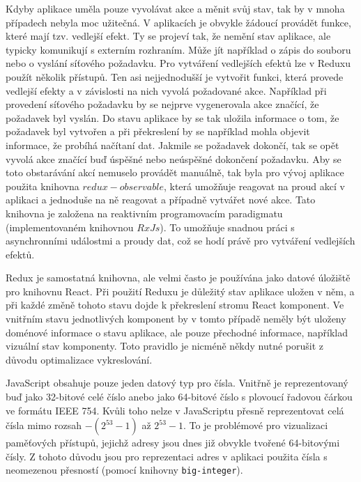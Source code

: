 Kdyby aplikace uměla pouze vyvolávat akce a měnit svůj stav, tak by v mnoha případech nebyla moc užitečná. V aplikacích je obvykle žádoucí provádět funkce, které mají tzv. vedlejší efekt. Ty se projeví tak, že nemění stav aplikace, ale typicky komunikují s externím rozhraním. Může jít například o zápis do souboru nebo o vyslání síťového požadavku. Pro vytváření vedlejších efektů lze v Reduxu použít několik přístupů. Ten asi nejjednodušší je vytvořit funkci, která provede vedlejší efekty a v závislosti na nich vyvolá požadované akce. Například při provedení síťového požadavku by se nejprve vygenerovala akce značící, že požadavek byl vyslán. Do stavu aplikace by se tak uložila informace o tom, že požadavek byl vytvořen a při překreslení by se například mohla objevit informace, že probíhá načítaní dat. Jakmile se požadavek dokončí, tak se opět vyvolá akce značící buď úspěšné nebo neúspěšné dokončení požadavku. Aby se toto obstarávání akcí nemuselo provádět manuálně, tak byla pro vývoj aplikace použita knihovna $redux-observable$, která umožňuje reagovat na proud akcí v aplikaci a jednoduše na ně reagovat a případně vytvářet nové akce. Tato knihovna je založena na reaktivním programovacím paradigmatu (implementovaném knihovnou $RxJs$). To umožňuje snadnou práci s asynchronními událostmi a proudy dat, což se hodí právě pro vytváření vedlejších efektů.

Redux je samostatná knihovna, ale velmi často je používána jako datové úložiště pro knihovnu React. Při použití Reduxu je důležitý stav aplikace uložen v něm, a při každé změně tohoto stavu dojde k překreslení stromu React komponent. Ve vnitřním stavu jednotlivých komponent by v tomto případě neměly být uloženy doménové informace o stavu aplikace, ale pouze přechodné informace, například vizuální stav komponenty. Toto pravidlo je nicméně někdy nutné porušit z důvodu optimalizace vykreslování.

JavaScript obsahuje pouze jeden datový typ pro čísla. Vnitřně je reprezentovaný buď jako 32-bitové celé číslo anebo jako 64-bitové číslo s plovoucí řadovou čárkou ve formátu IEEE 754. Kvůli toho nelze v JavaScriptu přesně reprezentovat celá čísla mimo rozsah $-(2^{53} - 1)$ až $2^{53} - 1$. To je problémové pro vizualizaci paměťových přístupů, jejichž adresy jsou dnes již obvykle tvořené 64-bitovými čísly. Z tohoto důvodu jsou pro reprezentaci adres v aplikaci použita čísla s neomezenou přesností (pomocí knihovny \texttt{big-integer}).

